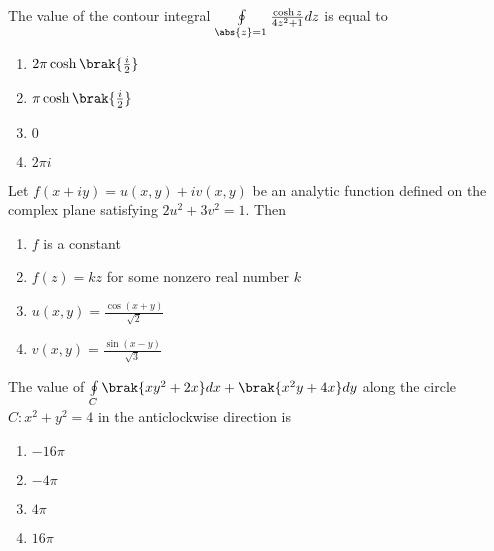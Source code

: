     \item The value of the contour integral $\oint\limits_{\abs{z}=1}\frac{\cosh{z}}{4z^2+1}dz$ is equal to
        \begin{enumerate}
            \item $2\pi\cosh\brak{\frac{i}{2}}$
            \item $\pi\cosh\brak{\frac{i}{2}}$
            \item $0$
            \item $2\pi i$
        \end{enumerate}

    \item Let $f(x+iy)=u(x,y)+iv(x,y)$ be an analytic function defined on the complex plane satisfying $2u^2+3v^2=1$. Then
        \begin{enumerate}
            \item $f$ is a constant
            \item $f(z)=kz$ for some nonzero real number $k$
            \item $u(x,y)=\frac{\cos(x+y)}{\sqrt{2}}$
            \item $v(x,y)=\frac{\sin(x-y)}{\sqrt{3}}$
        \end{enumerate}

    \item The value of $\oint\limits_{C}\brak{xy^2+2x}dx+\brak{x^2y+4x}dy$ along the circle $C:x^2+y^2=4$ in the anticlockwise direction is
        \begin{enumerate}
            \item $-16\pi$
            \item $-4\pi$
            \item $4\pi$
            \item $16\pi$
        \end{enumerate}
